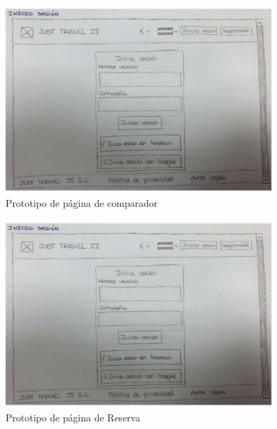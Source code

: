 \begin{figure}[H]
    \centering
    \includegraphics[page=4, width=0.9\textwidth]{./Imagenes/Prototipo/Prototipos definitivos - Iteracion I.pdf}
    \caption{Prototipo de página de comparador}
    \label{fig:prot_comp}
\end{figure}

\begin{figure}[H]
    \centering
    \includegraphics[page=6, width=0.9\textwidth]{./Imagenes/Prototipo/Prototipos definitivos - Iteracion I.pdf}
    \caption{Prototipo de página de Reserva}
    \label{fig:prot_reser}
\end{figure}

